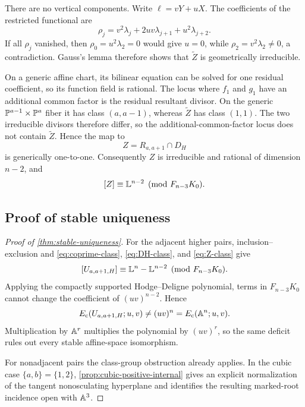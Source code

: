 \documentclass[11pt,reqno]{amsart}
\begin{document}
There are no vertical components.  Write \(\ell=vY+uX\).  The coefficients
of the restricted functional are
\[
\rho_j=v^2\lambda_j+2uv\lambda_{j+1}+u^2\lambda_{j+2}.
\]
If all \(\rho_j\) vanished, then
\(\rho_0=u^2\lambda_2=0\) would give \(u=0\), while
\(\rho_2=v^2\lambda_2\ne0\), a contradiction.  Gauss's lemma therefore
shows that \(\widetilde Z\) is geometrically irreducible.

On a generic affine chart, its bilinear equation can be solved for one
residual coefficient, so its function field is rational.  The locus where
\(f_1\) and \(g_1\) have an additional common factor is the residual
resultant divisor.  On the generic \(\mathbb P^{a-1}\times\mathbb P^a\) fiber it has
class \((a,a-1)\), whereas \(\widetilde Z\) has class \((1,1)\).  The two
irreducible divisors therefore differ, so the additional-common-factor locus
does not contain \(\widetilde Z\).  Hence the map to
\[
Z=R_{a,a+1}\cap D_H
\]
is generically one-to-one.  Consequently \(Z\) is irreducible and rational
of dimension \(n-2\), and
\begin{equation}
\label{eq:Z-class}
[Z]\equiv\mathbb L^{n-2}\pmod{F_{n-3}K_0}.
\end{equation}

\subsection{Proof of stable uniqueness}

\begin{proof}[Proof of \cref{thm:stable-uniqueness}]
For the adjacent higher pairs, inclusion--exclusion and
\eqref{eq:coprime-class}, \eqref{eq:DH-class}, and \eqref{eq:Z-class} give
\begin{equation}
\label{eq:deficit}
[U_{a,a+1,H}]
\equiv\mathbb L^n-\mathbb L^{n-2}
\pmod{F_{n-3}K_0}.
\end{equation}
Applying the compactly supported Hodge--Deligne polynomial, terms in
\(F_{n-3}K_0\) cannot change the coefficient of \((uv)^{n-2}\).  Hence
\[
E_{\mathrm c}(U_{a,a+1,H};u,v)\ne(uv)^n
=E_{\mathrm c}(\mathbb A^n;u,v).
\]
Multiplication by \(\mathbb A^r\) multiplies the polynomial by \((uv)^r\), so the
same deficit rules out every stable affine-space isomorphism.

For nonadjacent pairs the class-group obstruction already applies.  In the
cubic case \(\{a,b\}=\{1,2\}\),
\cref{prop:cubic-positive-internal} gives an explicit normalization of the
tangent nonosculating hyperplane and identifies the resulting marked-root
incidence open with \(\mathbb A^3\).
\end{proof}
\end{document}

